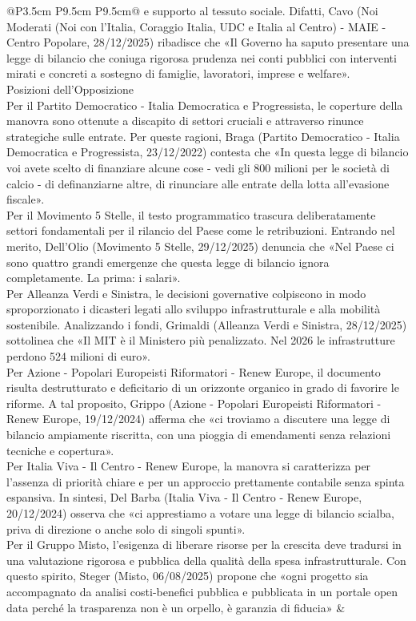 \documentclass[a4paper,11pt]{article}
\begin{document}
\begin{landscape}
\begin{longtable}{@{}P{3.5cm} P{9.5cm} P{9.5cm}@{}}
e supporto al tessuto sociale. Difatti, Cavo (Noi Moderati (Noi con l'Italia, Coraggio Italia, UDC e Italia al Centro) - MAIE - Centro Popolare, 28/12/2025) ribadisce che «Il Governo ha saputo presentare una legge di bilancio che coniuga rigorosa prudenza nei conti pubblici con interventi mirati e concreti a sostegno di famiglie, lavoratori, imprese e welfare».\\[6pt] Posizioni dell'Opposizione\\[6pt] Per il Partito Democratico - Italia Democratica e Progressista, le coperture della manovra sono ottenute a discapito di settori cruciali e attraverso rinunce strategiche sulle entrate. Per queste ragioni, Braga (Partito Democratico - Italia Democratica e Progressista, 23/12/2022) contesta che «In questa legge di bilancio voi avete scelto di finanziare alcune cose - vedi gli 800 milioni per le società di calcio - di definanziarne altre, di rinunciare alle entrate della lotta all'evasione fiscale».\\[6pt] Per il Movimento 5 Stelle, il testo programmatico trascura deliberatamente settori fondamentali per il rilancio del Paese come le retribuzioni. Entrando nel merito, Dell'Olio (Movimento 5 Stelle, 29/12/2025) denuncia che «Nel Paese ci sono quattro grandi emergenze che questa legge di bilancio ignora completamente. La prima: i salari».\\[6pt] Per Alleanza Verdi e Sinistra, le decisioni governative colpiscono in modo sproporzionato i dicasteri legati allo sviluppo infrastrutturale e alla mobilità sostenibile. Analizzando i fondi, Grimaldi (Alleanza Verdi e Sinistra, 28/12/2025) sottolinea che «Il MIT è il Ministero più penalizzato. Nel 2026 le infrastrutture perdono 524 milioni di euro».\\[6pt] Per Azione - Popolari Europeisti Riformatori - Renew Europe, il documento risulta destrutturato e deficitario di un orizzonte organico in grado di favorire le riforme. A tal proposito, Grippo (Azione - Popolari Europeisti Riformatori - Renew Europe, 19/12/2024) afferma che «ci troviamo a discutere una legge di bilancio ampiamente riscritta, con una pioggia di emendamenti senza relazioni tecniche e copertura».\\[6pt] Per Italia Viva - Il Centro - Renew Europe, la manovra si caratterizza per l'assenza di priorità chiare e per un approccio prettamente contabile senza spinta espansiva. In sintesi, Del Barba (Italia Viva - Il Centro - Renew Europe, 20/12/2024) osserva che «ci apprestiamo a votare una legge di bilancio scialba, priva di direzione o anche solo di singoli spunti».\\[6pt] Per il Gruppo Misto, l'esigenza di liberare risorse per la crescita deve tradursi in una valutazione rigorosa e pubblica della qualità della spesa infrastrutturale. Con questo spirito, Steger (Misto, 06/08/2025) propone che «ogni progetto sia accompagnato da analisi costi-benefici pubblica e pubblicata in un portale open data perché la trasparenza non è un orpello, è garanzia di fiducia» & \\

\end{longtable}
\end{landscape}
\end{document}
